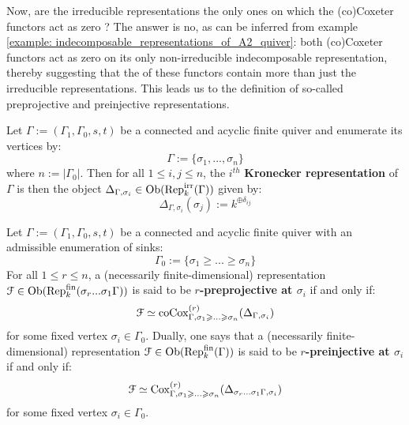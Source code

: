             Now, are the irreducible representations the only ones on which the (co)Coxeter functors act as zero ? The answer is no, as can be inferred from example \ref{example: indecomposable_representations_of_A2_quiver}: both (co)Coxeter functors act as zero on its only non-irreducible indecomposable representation, thereby suggesting that the  of these functors contain more than just the irreducible representations. This leads us to the definition of so-called preprojective and preinjective representations. 
            \begin{convention} \label{conv: kronecker_representations}
                Let $\Gamma := (\Gamma_1, \Gamma_0, s, t)$ be a connected and acyclic finite quiver and enumerate its vertices by:
                    $$\Gamma := \{\sigma_1, ..., \sigma_n\}$$
                where $n := |\Gamma_0|$. Then for all $1 \leq i, j \leq n$, the $i^{th}$ \textbf{Kronecker representation} of $\Gamma$ is then the object $\Delta_{\Gamma, \sigma_i} \in \mathrm{Ob}(\mathrm{Rep}_k^{\mathrm{irr}}(\Gamma))$ given by:
                    $$\Delta_{\Gamma, \sigma_i}(\sigma_j) := k^{\oplus \delta_{ij}}$$
            \end{convention}
            \begin{definition} \label{def: preprojective_and_preinjective_representations}
                Let $\Gamma := (\Gamma_1, \Gamma_0, s, t)$ be a connected and acyclic finite quiver with an admissible enumeration of sinks:
                    $$\Gamma_0 := \{\sigma_1 \geq ... \geq \sigma_n\}$$
                For all $1 \leq r \leq n$, a (necessarily finite-dimensional) representation $\mathcal{F} \in \mathrm{Ob}(\mathrm{Rep}_k^{\mathrm{fin}}(\sigma_r ... \sigma_1 \Gamma))$ is said to be \textbf{$r$-preprojective at $\sigma_i$} if and only if:
                    $$\mathcal{F} \simeq \mathrm{co}\mathrm{Cox}_{\Gamma, \sigma_1 \geqslant ...\geqslant \sigma_n}^{(r)}(\Delta_{\Gamma, \sigma_i})$$
                for some fixed vertex $\sigma_i \in \Gamma_0$. Dually, one says that a (necessarily finite-dimensional) representation $\mathcal{F} \in \mathrm{Ob}(\mathrm{Rep}_k^{\mathrm{fin}}(\Gamma))$ is said to be \textbf{$r$-preinjective at $\sigma_i$} if and only if:
                    $$\mathcal{F} \simeq \mathrm{Cox}_{\Gamma, \sigma_1 \geqslant ...\geqslant \sigma_n}^{(r)}(\Delta_{\sigma_r ... \sigma_1 \Gamma, \sigma_i})$$
                for some fixed vertex $\sigma_i \in \Gamma_0$.
            \end{definition}
